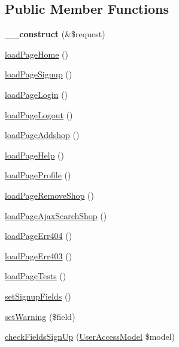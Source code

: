 \subsection*{Public Member Functions}
\begin{DoxyCompactItemize}
\item 
\hypertarget{classBasePageController_a483998015a3518d49897d271de2e3c2d}{{\bfseries \+\_\+\+\_\+construct} (\&\$request)}\label{classBasePageController_a483998015a3518d49897d271de2e3c2d}

\item 
\hyperlink{classBasePageController_a66084d1db3fcc8a5cb1f44cd82b7948a}{load\+Page\+Home} ()
\item 
\hyperlink{classBasePageController_aae6760084899d261e8f19f8dc2cbfd30}{load\+Page\+Signup} ()
\item 
\hyperlink{classBasePageController_a36cdd7c6a038c2664b333fbf8de6383a}{load\+Page\+Login} ()
\item 
\hyperlink{classBasePageController_ae7d620e0d251d06407cfe960cafe3d57}{load\+Page\+Logout} ()
\item 
\hyperlink{classBasePageController_aecf3ccde53aaa9b780feb5e12f2904ea}{load\+Page\+Addshop} ()
\item 
\hyperlink{classBasePageController_ae7ecc6f491f580059698d1a1a8e8d9ac}{load\+Page\+Help} ()
\item 
\hyperlink{classBasePageController_affa5617be55ed9bf233fd7bd1b2e19c9}{load\+Page\+Profile} ()
\item 
\hyperlink{classBasePageController_ad63921678e571dbd0a37d3afd6b55f5a}{load\+Page\+Remove\+Shop} ()
\item 
\hyperlink{classBasePageController_a96ace79928e80d29e6560b1fb965e859}{load\+Page\+Ajax\+Search\+Shop} ()
\item 
\hyperlink{classBasePageController_a07d3e03b8e2ec5cc698f057a3496c14b}{load\+Page\+Err404} ()
\item 
\hyperlink{classBasePageController_a9ecd03fb676ab32ee9c2cb4e412757cc}{load\+Page\+Err403} ()
\item 
\hyperlink{classBasePageController_a179555764b7f9269d724522d4c32a59b}{load\+Page\+Tests} ()
\item 
\hyperlink{classBasePageController_a877c4f32b7d39e566f7832aef94c2f11}{set\+Signup\+Fields} ()
\item 
\hyperlink{classBasePageController_a777f34065716ce7f7706ea745fbdd254}{set\+Warning} (\$field)
\item 
\hyperlink{classBasePageController_a56e85dfb915144831cf39435b88774f5}{check\+Fields\+Sign\+Up} (\hyperlink{classUserAccessModel}{User\+Access\+Model} \$model)

\end{DoxyCompactItemize}
